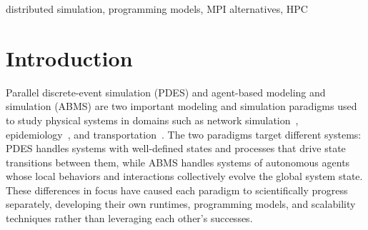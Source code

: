 \begin{IEEEkeywords}
distributed simulation, programming models, MPI alternatives, HPC
\end{IEEEkeywords}

\section{Introduction}          %

Parallel discrete-event simulation (PDES) and agent-based modeling
and simulation (ABMS) are two important modeling and simulation paradigms 
used to study physical systems in domains such as network simulation~\cite{network-sim}, epidemiology~\cite{epi}, and transportation~\cite{transport}.
The two paradigms target different systems: PDES
handles systems with well-defined states and processes that drive
state transitions between them, while ABMS handles systems of
autonomous agents whose local behaviors and interactions
collectively evolve the global system state. These differences in focus have
caused each paradigm to scientifically progress separately, developing
their own runtimes, programming models, and scalability techniques
rather than leveraging each other's successes.



